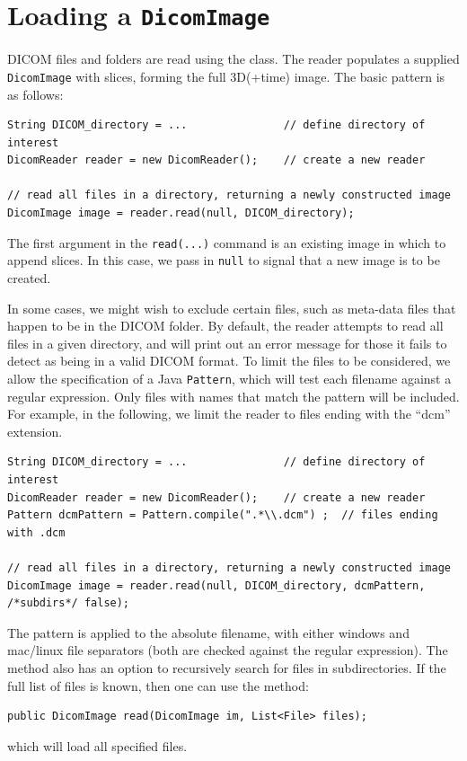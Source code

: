 \section{Loading a \texttt{DicomImage} \label{sec:dicom:loading}}

DICOM files and folders are read using the  class.  The 
reader populates a supplied \lstinline{DicomImage} with slices, forming the full 3D(+time)
image. The basic pattern is as follows:
\begin{lstlisting}[]
String DICOM_directory = ...               // define directory of interest
DicomReader reader = new DicomReader();    // create a new reader

// read all files in a directory, returning a newly constructed image
DicomImage image = reader.read(null, DICOM_directory);  
\end{lstlisting}
The first argument in the \lstinline{read(...)} command is an existing image in which to append slices.
In this case, we pass in \lstinline{null} to signal that a new image is to be created.

In some cases, we might wish to exclude certain files, such as meta-data files that
happen to be in the DICOM folder.  By default, the reader attempts to read
all files in a given directory, and will print out an error message for those it fails
to detect as being in a valid DICOM format.  To limit the files to be considered,
we allow the specification of a Java \lstinline{Pattern}, which will test
each filename against a regular expression.  Only files with names that match
the pattern will be included.  For example, in the following, we limit the reader
to files ending with the ``dcm'' extension.
\begin{lstlisting}[]
String DICOM_directory = ...               // define directory of interest
DicomReader reader = new DicomReader();    // create a new reader
Pattern dcmPattern = Pattern.compile(".*\\.dcm") ;  // files ending with .dcm

// read all files in a directory, returning a newly constructed image
DicomImage image = reader.read(null, DICOM_directory, dcmPattern, /*subdirs*/ false);  
\end{lstlisting}
The pattern is applied to the absolute filename, with either windows and mac/linux file
separators (both are checked against the regular expression).  The method also has
an option to recursively search for files in subdirectories.  If the full list of files is 
known, then one can use the method:
\begin{lstlisting}[]
public DicomImage read(DicomImage im, List<File> files);
\end{lstlisting}
which will load all specified files.

